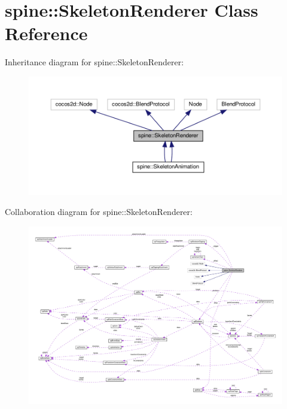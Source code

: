 \hypertarget{classspine_1_1SkeletonRenderer}{}\section{spine\+:\+:Skeleton\+Renderer Class Reference}
\label{classspine_1_1SkeletonRenderer}


Inheritance diagram for spine\+:\+:Skeleton\+Renderer\+:
\nopagebreak
\begin{figure}[H]
\begin{center}
\leavevmode
\includegraphics[width=350pt]{classspine_1_1SkeletonRenderer__inherit__graph}
\end{center}
\end{figure}


Collaboration diagram for spine\+:\+:Skeleton\+Renderer\+:
\nopagebreak
\begin{figure}[H]
\begin{center}
\leavevmode
\includegraphics[width=350pt]{classspine_1_1SkeletonRenderer__coll__graph}
\end{center}
\end{figure}
